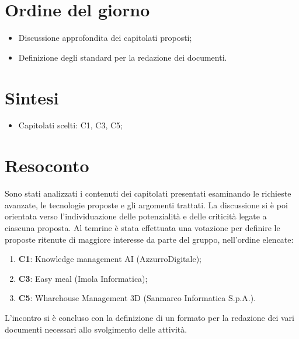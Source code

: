 \section{Ordine del giorno}
\begin{itemize}
    \item Discussione approfondita dei capitolati proposti;
    \item Definizione degli standard per la redazione dei documenti.
\end{itemize}

\section{Sintesi}
\begin{itemize}
    \item Capitolati scelti: C1, C3, C5;
\end{itemize}

\section{Resoconto}
Sono stati analizzati i contenuti dei capitolati presentati esaminando le richieste avanzate, le tecnologie proposte e gli argomenti trattati.
La discussione si è poi orientata verso l'individuazione delle potenzialità e delle criticità legate a ciascuna proposta. 
Al temrine è stata effettuata una votazione per definire le proposte ritenute di maggiore interesse da parte del gruppo, nell'ordine elencate:
\begin{enumerate}
    \item \textbf{C1}: Knowledge management AI (AzzurroDigitale);
    \item \textbf{C3}: Easy meal (Imola Informatica);
    \item \textbf{C5}: Wharehouse Management 3D (Sanmarco Informatica S.p.A.).
\end{enumerate}

L'incontro si è concluso con la definizione di un formato per la redazione dei vari documenti necessari allo svolgimento delle attività.